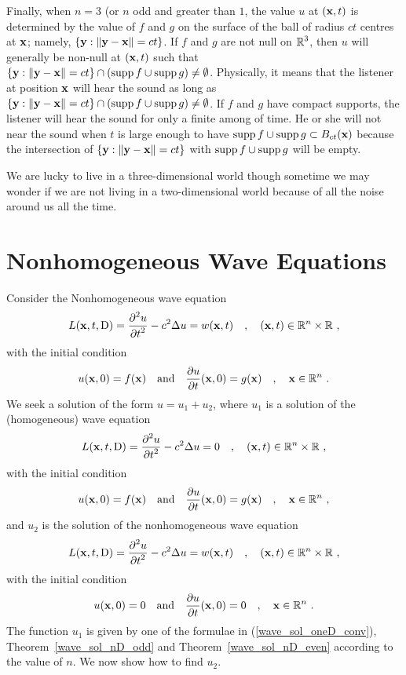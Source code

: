 Finally, when $n=3$ (or $n$ odd and greater than $1$, the value $u$ at
$(\mathbf{x},t)$ is determined by the value of $f$ and $g$ on the surface
of the ball of radius $ct$ centres at $\mathbf{x}$; namely,
$\left\{\mathbf{y} : \|\mathbf{y}-\mathbf{x}\| = ct\right\}$.  If $f$ and $g$ are
not null on $\displaystyle \mathbb{R}^3$, then $u$ will generally be non-null at
$(\mathbf{x},t)$ such that
$\left\{ \mathbf{y} : \|\mathbf{y}-\mathbf{x}\| = ct \right\} \cap
( \operatorname{supp} f \cup \operatorname{supp} g) \neq \emptyset$.
Physically, it means that the listener at position $\mathbf{x}$ will hear
the sound as long as $\left\{ \mathbf{y} : \|\mathbf{y}-\mathbf{x}\| = ct\right\} \cap
(\operatorname{supp} f \cup \operatorname{supp} g) \neq \emptyset$.
If $f$ and $g$ have compact supports, the listener will hear the
sound for only a finite among of time.  He or she will not near the
sound when $t$ is large enough to have
$\operatorname{supp} f \cup \operatorname{supp} g \subset B_{ct}(\mathbf{x})$ because the
intersection of $\left\{ \mathbf{y} : \|\mathbf{y}-\mathbf{x}\| = ct\right\}$
with $\operatorname{supp} f \cup \operatorname{supp} g$ will be empty.

We are lucky to live in a three-dimensional world though sometime we
may wonder if we are not living in a two-dimensional world because of
all the noise around us all the time.


\section{Nonhomogeneous Wave Equations} \label{sectDuhamel}

Consider the Nonhomogeneous wave equation
\[
L(\mathbf{x},t,\operatorname{D}) = \frac{\displaystyle \partial^{2}{u}} {\displaystyle \partial t^{2}} - c^2 \Delta u = w(\mathbf{x},t) \quad ,
\quad (\mathbf{x},t) \in \mathbb{R}^n \times \mathbb{R} \ ,
\]
with the initial condition
\[
u(\mathbf{x}, 0) = f(\mathbf{x}) \quad \text{and} \quad
\frac{\partial{u}}{\partial t}(\mathbf{x},0) = g(\mathbf{x}) \quad , \quad
\mathbf{x} \in \mathbb{R}^n \ .
\]
We seek a solution of the form $u=u_1+u_2$, where $u_1$ is a solution
of the (homogeneous) wave equation
\[
L(\mathbf{x},t,\operatorname{D}) = \frac{\displaystyle \partial^{2}{u}} {\displaystyle \partial t^{2}} - c^2 \Delta u = 0 \quad ,
\quad (\mathbf{x},t) \in \mathbb{R}^n \times \mathbb{R} \ ,
\]
with the initial condition
\[
u(\mathbf{x}, 0) = f(\mathbf{x}) \quad \text{and} \quad
\frac{\partial{u}}{\partial t}(\mathbf{x},0) = g(\mathbf{x}) \quad , \quad
\mathbf{x} \in \mathbb{R}^n \ ,
\]
and $u_2$ is the solution of the nonhomogeneous wave equation
\begin{equation} \label{wave_nD_inh}
L(\mathbf{x},t,\operatorname{D}) = \frac{\displaystyle \partial^{2}{u}} {\displaystyle \partial t^{2}} - c^2 \Delta u = w(\mathbf{x},t) \quad ,
\quad (\mathbf{x},t) \in \mathbb{R}^n \times \mathbb{R} \ ,
\end{equation}
with the initial condition
\begin{equation} \label{wave_nD_inh_cond}
u(\mathbf{x}, 0) = 0 \quad \text{and} \quad
\frac{\partial{u}}{\partial t}(\mathbf{x},0) = 0 \quad , \quad
\mathbf{x} \in \mathbb{R}^n \ .
\end{equation}
The function $u_1$ is given by one of the formulae in
(\ref{wave_sol_oneD_conv}), Theorem~\ref{wave_sol_nD_odd} and
Theorem~\ref{wave_sol_nD_even} according to the value of $n$.
We now show how to find $u_2$.

